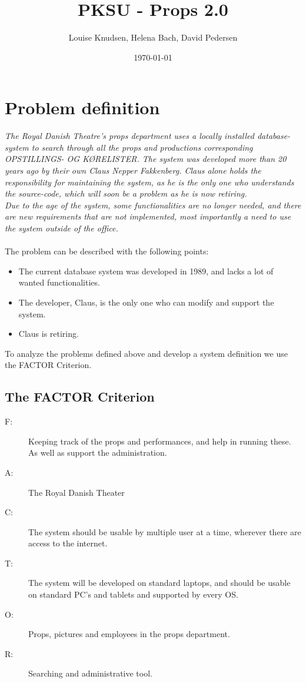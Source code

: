 \documentclass[12pt]{article}
\title{PKSU - Props 2.0}
\author{Louise Knudsen, Helena Bach, David Pedersen}
\date{\today}
\begin{document}
\maketitle
\section{Problem definition}
\textit{The Royal Danish Theatre's props department uses a locally installed database-system to search through all the props and productions corresponding OPSTILLINGS- OG KØRELISTER. The system was developed more than 20 years ago by their own Claus Nepper Fakkenberg. Claus alone holds the responsibility for maintaining the system, as he is the only one who understands the source-code, which will soon be a problem as he is now retiring. \\
Due to the age of the system, some functionalities are no longer needed, and there are new requirements that are not implemented, most importantly a need to use the system outside of the office.} \\\\
The problem can be described with the following points:
\begin{itemize}
\item The current database system was developed in 1989, and lacks a lot of wanted functionalities.
\item The developer, Claus, is the only one who can modify and support the system.
\item Claus is retiring.
\end{itemize}
To analyze the problems defined above and develop a system definition we use the FACTOR Criterion.
\subsection{The FACTOR Criterion}
\begin{description}
\item[F:] Keeping track of the props and performances, and help in running these. As well as support the administration. 
\item[A:] The Royal Danish Theater 
\item[C:] The system should be usable by multiple user at a time, wherever there are access to the internet. 
\item[T:] The system will be developed on standard laptops, and should be usable on standard PC's and tablets and supported by every OS. 
\item[O:] Props, pictures and employees in the props department. 
\item[R:] Searching and administrative tool.
\end{description}
\end{document}
